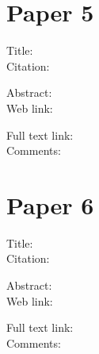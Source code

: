 \documentclass{scrartcl}
\begin{document}
\section*{Paper 5}
\begin{description}
	\item[Title:] 
	\item[Citation:] \cite{}
	\item[Abstract:] 
	\item[Web link:] \url{}
	\item[Full text link:]
	\item[Comments:]  
\end{description}

\section*{Paper 6}
\begin{description}
	\item[Title:] 
	\item[Citation:] \cite{}
	\item[Abstract:] 
	\item[Web link:] \url{}
	\item[Full text link:]
	\item[Comments:]  
\end{description}




\end{document}
